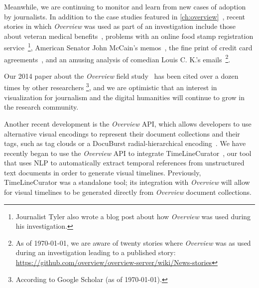 Meanwhile, we are continuing to monitor and learn from new cases of adoption by journalists.
In addition to the case studies featured in \autoref{ch:overview}~\cite{Gillum2012,Keller2012,Playford2013,Stray2012,Wade2012}, recent stories in which {\it Overview} was used as part of an investigation include those about veteran medical benefits~\cite{Figueroa2014}, problems with an online food stamp registration service~\cite{Dukes2013}\footnote{Journalist Tyler \citet{Dukes2014} also wrote a blog post about how {\it Overview} was used during his investigation.}, American Senator John McCain's memos~\cite{Watzman2014}, the fine print of credit card agreements~\cite{Williams2014}, and an amusing analysis of comedian Louis C. K.'s emails~\cite{Lafrance2014}\footnote{As of \today, we are aware of twenty stories where {\it Overview} was as used during an investigation leading to a published story: \url{https://github.com/overview/overview-server/wiki/News-stories}}.

Our 2014 paper about the {\it Overview} field study~\cite{Brehmer2014} has been cited over a dozen times by other researchers \footnote{According to Google Scholar (as of \today).}, and we are optimistic that an interest in visualization for journalism and the digital humanities will continue to grow in the research community.

Another recent development is the {\it Overview} \ac{API}, which allows developers to use alternative visual encodings to represent their document collections and their tags, such as tag clouds or a DocuBurst radial-hierarchical encoding~\cite{Collins2009}.
We have recently began to use the {\it Overview} \ac{API} to integrate TimeLineCurator~\cite{Fulda2015}, our tool that uses \ac{NLP} to automatically extract temporal references from unstructured text documents in order to generate visual timelines.
Previously, TimeLineCurator was a standalone tool; its integration with {\it Overview} will allow for visual timelines to be generated directly from {\it Overview} document collections.


